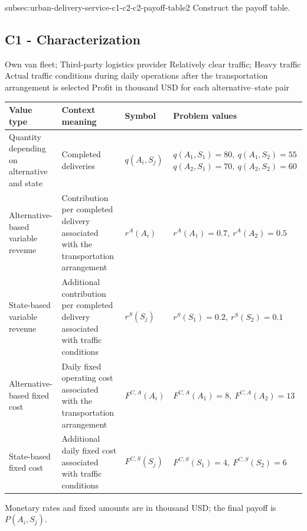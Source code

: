 {\begin{enumerate}
		\CriterionTask
		{subsec:urban-delivery-service-c1-c2-c2-payoff-table}{2}
		{Construct the payoff table. }
	\end{enumerate}

	\label{subsec:urban-delivery-service-c1-c2-c1-characterization}
	\subsection*{C1 - Characterization }
	
	\DecisionElementsTable
		{Own van fleet; Third-party logistics provider}
		{Relatively clear traffic; Heavy traffic}
		{Actual traffic conditions during daily operations after the transportation arrangement is selected}
		{Profit in thousand USD for each alternative--state pair}

	\begin{center}
	\small
	\begin{tabularx}{\textwidth}{@{}>{\raggedright\arraybackslash}p{}>{\raggedright\arraybackslash}p{}>{\raggedright\arraybackslash}p{}>{\raggedright\arraybackslash}X@{}}
	\toprule
	Value type & Context meaning & Symbol & Problem values \\
	\midrule
	Quantity depending on alternative and state
	& Completed deliveries
	& \(q(A_i,S_j)\)
	& \(q(A_1,S_1)=80,\ q(A_1,S_2)=55\)\newline
	  \(q(A_2,S_1)=70,\ q(A_2,S_2)=60\) \\
	Alternative-based variable revenue
	& Contribution per completed delivery associated with the transportation arrangement
	& \(r^A(A_i)\)
	& \(r^A(A_1)=0.7,\ r^A(A_2)=0.5\) \\
	State-based variable revenue
	& Additional contribution per completed delivery associated with traffic conditions
	& \(r^S(S_j)\)
	& \(r^S(S_1)=0.2,\ r^S(S_2)=0.1\) \\
	Alternative-based fixed cost
	& Daily fixed operating cost associated with the transportation arrangement
	& \(F^{C,A}(A_i)\)
	& \(F^{C,A}(A_1)=8,\ F^{C,A}(A_2)=13\) \\
	State-based fixed cost
	& Additional daily fixed cost associated with traffic conditions
	& \(F^{C,S}(S_j)\)
	& \(F^{C,S}(S_1)=4,\ F^{C,S}(S_2)=6\) \\
	\bottomrule
	\end{tabularx}
	\end{center}

	Monetary rates and fixed amounts are in thousand USD; the final payoff is \(P(A_i,S_j)\).

}

